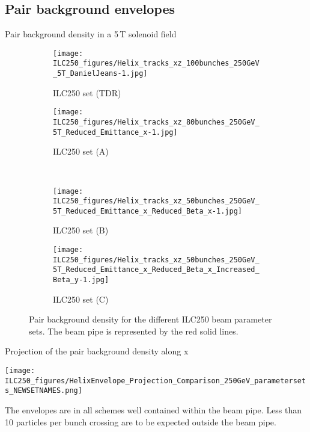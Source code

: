 \documentclass[xcolor={dvipsnames}]{beamer}
\begin{document}
\subsection{Pair background envelopes}
\begin{frame}{Pair background density in a 5\,T solenoid field}
 \begin{figure}
\centering
\begin{subfigure}[t]{0.35\textwidth}
\centering
\texttt{[image: ILC250\_figures/Helix\_tracks\_xz\_100bunches\_250GeV\_5T\_DanielJeans-1.jpg]}
\caption{ILC250 set (TDR)}
\end{subfigure}
\hspace*{0.1cm}
\begin{subfigure}[t]{0.35\textwidth}
\centering
\texttt{[image: ILC250\_figures/Helix\_tracks\_xz\_80bunches\_250GeV\_5T\_Reduced\_Emittance\_x-1.jpg]}
\caption{ILC250 set (A)}
\end{subfigure}
\\
\begin{subfigure}[t]{0.35\textwidth}
\centering
\texttt{[image: ILC250\_figures/Helix\_tracks\_xz\_50bunches\_250GeV\_5T\_Reduced\_Emittance\_x\_Reduced\_Beta\_x-1.jpg]}
\caption{ILC250 set (B)}
\end{subfigure}
\hspace*{0.1cm}
\begin{subfigure}[t]{0.35\textwidth}
\centering
\texttt{[image: ILC250\_figures/Helix\_tracks\_xz\_50bunches\_250GeV\_5T\_Reduced\_Emittance\_x\_Reduced\_Beta\_x\_Increased\_Beta\_y-1.jpg]}
\caption{ILC250 set (C)}
\end{subfigure}
\caption{Pair background density for the different ILC250 beam parameter sets.
The beam pipe is represented by the red solid lines.}
\label{fig:Envelopes}
\end{figure}

\end{frame}

\begin{frame}{Projection of the pair background density along x}
\begin{center}
 \texttt{[image: ILC250\_figures/HelixEnvelope\_Projection\_Comparison\_250GeV\_parametersets\_NEWSETNAMES.png]}
\end{center}
The envelopes are in all schemes well contained within the beam pipe. Less than 10 particles per bunch crossing are to be expected outside the beam pipe.
\end{frame}
\end{document}
